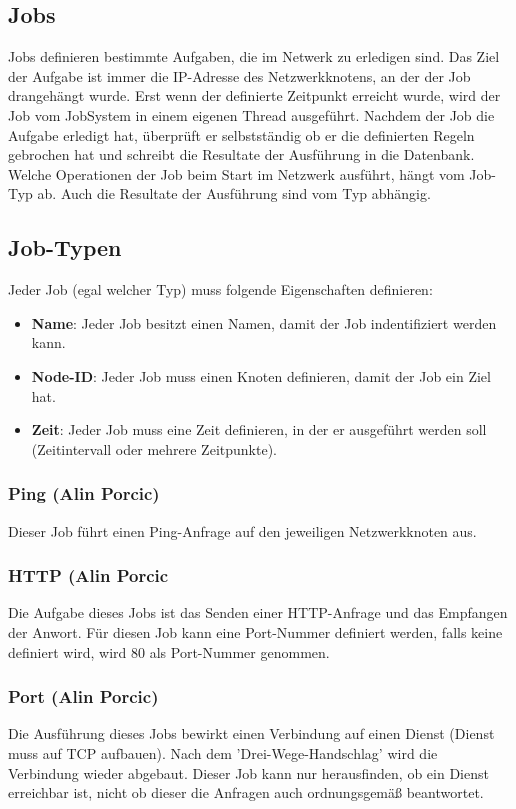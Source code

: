 \documentclass[12pt,a4paper]{report}
\begin{document}
\begin{onehalfspace}
\chapter{Jobs}

Jobs definieren bestimmte Aufgaben, die im Netwerk zu erledigen sind. Das Ziel der Aufgabe ist immer die IP-Adresse des Netzwerkknotens, an der der Job drangehängt wurde. Erst wenn der definierte Zeitpunkt erreicht wurde, wird der Job vom JobSystem in einem eigenen Thread ausgeführt. Nachdem der Job die Aufgabe erledigt hat, überprüft er selbstständig ob er die definierten Regeln gebrochen hat und schreibt die Resultate der Ausführung in die Datenbank. Welche Operationen der Job beim Start im Netzwerk ausführt, hängt vom Job-Typ ab. Auch die Resultate der Ausführung sind vom Typ abhängig.

\section{Job-Typen}

Jeder Job (egal welcher Typ) muss folgende Eigenschaften definieren:\\

\begin{itemize}
\item \textbf{Name}: Jeder Job besitzt einen Namen, damit der Job indentifiziert werden kann.
\item \textbf{Node-ID}: Jeder Job muss einen Knoten definieren, damit der Job ein Ziel hat.
\item \textbf{Zeit}: Jeder Job muss eine Zeit definieren, in der er ausgeführt werden soll (Zeitintervall oder mehrere Zeitpunkte).
\end{itemize}

\subsection{Ping (Alin Porcic)} Dieser Job führt einen Ping-Anfrage auf den jeweiligen Netzwerkknoten aus.

\subsection{HTTP (Alin Porcic} Die Aufgabe dieses Jobs ist das Senden einer HTTP-Anfrage und das Empfangen der Anwort. Für diesen Job kann eine Port-Nummer definiert werden, falls keine definiert wird, wird 80 als Port-Nummer genommen.

\subsection{Port (Alin Porcic)} Die Ausführung dieses Jobs bewirkt einen Verbindung auf einen Dienst (Dienst muss auf TCP aufbauen). Nach dem 'Drei-Wege-Handschlag' wird die Verbindung wieder abgebaut. Dieser Job kann nur herausfinden, ob ein Dienst erreichbar ist, nicht ob dieser die Anfragen auch ordnungsgemäß beantwortet.


\end{onehalfspace}
\end{document}
